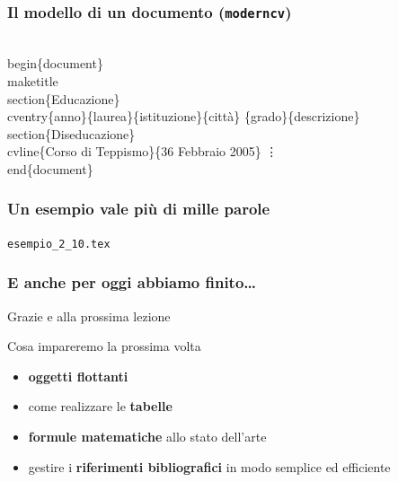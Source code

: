 \documentclass[svgnames,%
	ucs,%
	pdftex]{guitbeamer}
\begin{document}
\begin{frame}
  \frametitle{Il modello di un documento (\texttt{moderncv})}
	\begin{LaTeXcode}
		\\begin\{document\}\n
	  \onslide<2->
		\alert{\\maketitle}\n
	  \onslide<3->
		\hspace*{2ex}\alert{\\section\{}Educazione\alert{\}}\n
		\hspace*{2ex}\alert{\\cventry\{}anno\alert{\}\{}laurea\alert{\}\{}istituzione\alert{\}\{}città\alert{\}}\n
		\hspace*{10ex}\alert{\{}grado\alert{\}\{}descrizione\alert{\}}\n
	  \smallskip
	  \onslide<4->
		\hspace*{2ex}\\section\{Diseducazione\}\n
		\hspace*{2ex}\\cvline\{Corso di Teppismo\}\{36 Febbraio 2005\}\n
		\hspace*{15ex}\vdots\n
	  \smallskip
	  \onslide<1->
		\smallskip
		\\end\{document\}

	\end{LaTeXcode}
\end{frame}
\begin{frame}
  \frametitle{Un esempio vale pi\`u di mille parole}
	\begin{center}
		\alert{\texttt{esempio\_2\_10.tex}}
	\end{center}
\end{frame}
\begin{frame}
  \frametitle{E anche per oggi abbiamo finito\dots}
	\begin{center}
	  \huge
		Grazie e alla prossima lezione
	\end{center}
  \medskip
	\begin{block}{Cosa impareremo la prossima volta}
		\begin{itemize}
			\item \textbf{oggetti flottanti} 
			\item come realizzare le \textbf{tabelle} 
			\item \textbf{formule matematiche} allo stato dell'arte
			\item gestire i \textbf{riferimenti bibliografici} in modo semplice ed efficiente
		\end{itemize}
	\end{block}
\end{frame}
\end{document}
